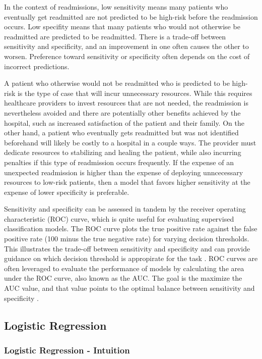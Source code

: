 \documentclass[sigconf]{acmart}
\begin{document}
In the context of readmissions, low sensitivity means many patients who eventually get readmitted are not predicted to be high-risk before the readmission occurs. Low specifity means that many patients who would not otherwise be readmitted are predicted to be readmitted. There is a trade-off between sensitivity and specificity, and an improvement in one often causes the other to worsen. Preference toward sensitivity or specificity often depends on the cost of incorrect predictions.

A patient who otherwise would not be readmitted who is predicted to be high-risk is the type of case that will incur unnecessary resources. While this requires healthcare providers to invest resources that are not needed, the readmission is nevertheless avoided and there are potentially other benefits achieved by the hospital, such as increased satisfaction of the patient and their family. On the other hand, a patient who eventually gets readmitted but was not identified beforehand will likely be costly to a hospital in a couple ways. The provider must dedicate resources to stabilizing and healing the patient, while also incurring penalties if this type of readmission occurs frequently. If the expense of an unexpected readmission is higher than the expense of deploying unncecessary resources to low-risk patients, then a model that favors higher sensitivity at the expense of lower specificity is preferable.

Sensitivity and specificity can be assessed in tandem by the receiver operating characteristic (ROC) curve, which is quite useful for evaluating supervised classification models. The ROC curve plots the true positive rate against the false positive rate (100 minus the true negative rate) for varying decision thresholds. This illustrates the trade-off between sensitivity and specificity and can provide guidance on which decision threshold is appropirate for the task \cite{cite12}. ROC curves are often leveraged to evaluate the performance of models by calculating the area under the ROC curve, also known as the AUC. The goal is the maximize the AUC value, and that value points to the optimal balance between sensitivity and specificity \cite{cite12}.

\subsection{Logistic Regression}

\subsubsection{Logistic Regression - Intuition}
\end{document}
